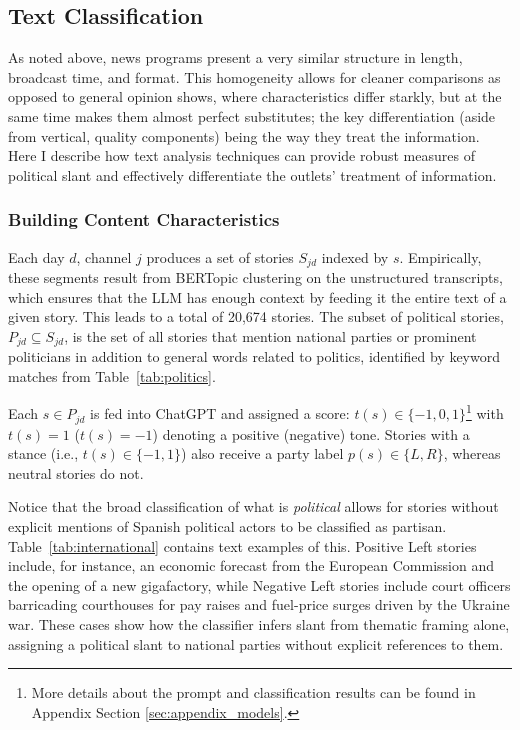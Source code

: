 \documentclass[12pt]{article}
\begin{document}
	
	
	
	\subsection{Text Classification}
	
	As noted above,  news programs present a very similar structure in length, broadcast time, and format. This homogeneity allows for cleaner comparisons as opposed to general opinion shows, where characteristics differ starkly, but at the same time makes them almost perfect substitutes; the key differentiation (aside from vertical, quality components) being the way they treat the information. Here I describe how text analysis techniques can provide robust measures of political slant and effectively differentiate the outlets' treatment of  information. 
	

	
	\subsubsection*{Building Content Characteristics}
	
	Each day \(d\), channel \(j\) produces a set of stories \(S_{jd}\) indexed by \(s\). Empirically, these segments result from BERTopic clustering on the unstructured transcripts, which ensures that the LLM has enough context by feeding it the entire text of a given story. This leads to a total of 20,674 stories. The subset of political stories, \({P}_{jd}\subseteq S_{jd}\), is the set of all stories that mention national parties or prominent politicians in addition to general words related to politics, identified by keyword matches from Table~\ref{tab:politics}.
	
	Each \(s\in {P}_{jd}\) is fed into ChatGPT and  assigned a score: \({t}(s)\in\{-1,0,1\}\)\footnote{More details about the prompt and classification results can be found in Appendix Section \ref{sec:appendix_models}.} with ${t}(s)=1$ (${t}(s)=-1$) denoting a positive (negative) tone. Stories with a stance (i.e., \({t}(s)\in\{-1,1\}\)) also receive a party label \({p}(s)\in\{L,R\}\), whereas neutral stories do not. 
	
	Notice that the broad classification of what is \emph{political} allows for stories without explicit mentions of Spanish political actors to be classified as partisan. Table~\ref{tab:international} contains text examples of this.  Positive Left stories include, for instance,  an economic forecast from the European Commission and the opening of a new gigafactory, while Negative Left stories include court officers barricading courthouses for pay raises and fuel-price surges driven by the Ukraine war. These cases show how the classifier infers slant from thematic framing alone, assigning a political slant to national parties without explicit references to them. 
	
\end{document}
